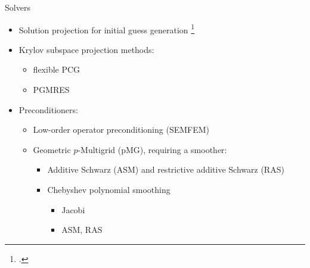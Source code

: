 \begin{frame}{Solvers}
  \begin{itemize}
    \item Solution projection for initial guess generation \footcite{fischer_projection_1998}
    \item Krylov subspace projection methods:
    \begin{itemize}
      \item flexible PCG
      \item PGMRES
    \end{itemize}
    \item Preconditioners:
    \begin{itemize}
      \item Low-order operator preconditioning (SEMFEM)
      \item Geometric $p$-Multigrid (pMG), requiring a smoother:
      \begin{itemize}
        \item Additive Schwarz (ASM) and restrictive additive Schwarz (RAS)
        \item Chebyshev polynomial smoothing
        \begin{itemize}
          \item Jacobi
          \item ASM, RAS
        \end{itemize}
      \end{itemize}
    \end{itemize}
  \end{itemize}
\end{frame}
